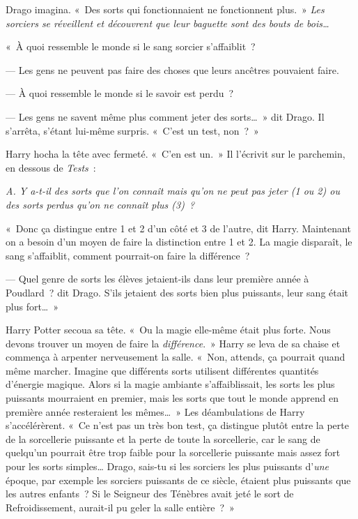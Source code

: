 Drago imagina.
«~Des sorts qui fonctionnaient ne fonctionnent plus.~»
\emph{Les sorciers se réveillent et découvrent que leur baguette sont des bouts de bois…}

«~À quoi ressemble le monde si le sang sorcier s'affaiblit~?

--- Les gens ne peuvent pas faire des choses que leurs ancêtres pouvaient faire.

--- À quoi ressemble le monde si le savoir est perdu~?

--- Les gens ne savent même plus comment jeter des sorts…~»
dit Drago.
Il s'arrêta, s'étant lui-même surpris.
«~C'est un test, non~?~»

Harry hocha la tête avec fermeté.
«~C'en est un.~»
Il l'écrivit sur le parchemin, en dessous de \emph{Tests}~:

\emph{A.
Y a-t-il des sorts que l'on connaît mais qu'on ne peut pas jeter (1 ou 2) ou des sorts perdus qu'on ne connaît plus (3)~?}

«~Donc ça distingue entre 1 et 2 d'un côté et 3 de l'autre, dit Harry.
Maintenant on a besoin d'un moyen de faire la distinction entre 1 et 2.
La magie disparaît, le sang s'affaiblit, comment pourrait-on faire la différence~?

--- Quel genre de sorts les élèves jetaient-ils dans leur première année à Poudlard~? dit Drago.
S'ils jetaient des sorts bien plus puissants, leur sang était plus fort…~»

Harry Potter secoua sa tête.
«~Ou la magie elle-même était plus forte.
Nous devons trouver un moyen de faire la \emph{différence}.~»
Harry se leva de sa chaise et commença à arpenter nerveusement la salle.
«~Non, attends, ça pourrait quand même marcher.
Imagine que différents sorts utilisent différentes quantités d'énergie magique.
Alors si la magie ambiante s'affaiblissait, les sorts les plus puissants mourraient en premier, mais les sorts que tout le monde apprend en première année resteraient les mêmes…~»
Les déambulations de Harry s'accélérèrent.
«~Ce n'est pas un très bon test, ça distingue plutôt entre la perte de la sorcellerie puissante et la perte de toute la sorcellerie, car le sang de quelqu'un pourrait être trop faible pour la sorcellerie puissante mais assez fort pour les sorts simples…
Drago, sais-tu si les sorciers les plus puissants d'\emph{une} époque, par exemple les sorciers puissants de ce siècle, étaient plus puissants que les autres enfants~?
Si le Seigneur des Ténèbres avait jeté le sort de Refroidissement, aurait-il pu geler la salle entière~?~»

